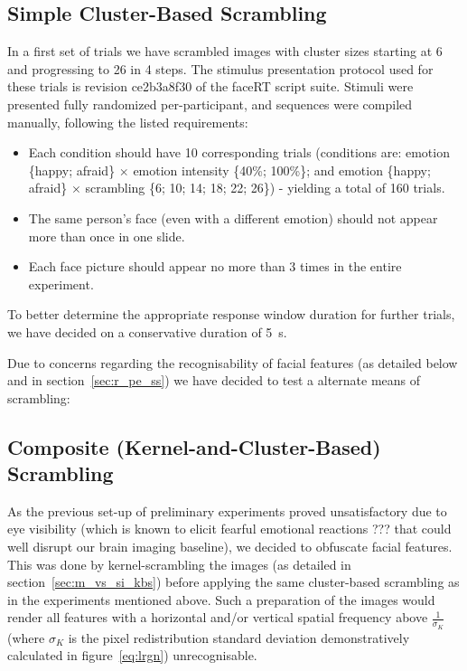 	\subsection{Simple Cluster-Based Scrambling}\label{sec:m_pe_ss}
	    In a first set of trials we have scrambled images with cluster sizes starting at \SI{6}{\pixel} and progressing to \SI{26}{\pixel} in \SI{4}{\pixel} steps.
	    The stimulus presentation protocol used for these trials is revision \textcolor{lg}{ce2b3a8f30} of the faceRT\cite{faceRT} script suite.
	    Stimuli were presented fully randomized per-participant, and sequences were compiled manually, following the listed requirements:
	    \begin{itemize}
		\item Each condition should have 10 corresponding trials (conditions are: emotion \{happy; afraid\} $\times$ emotion intensity \{40\%; 100\%\}; and emotion \{happy; afraid\} $\times$ scrambling \{6; 10; 14; 18; 22; 26\}) - yielding a total of 160 trials.
		\item The same person's face (even with a different emotion) should not appear more than once in one slide.
		\item Each face picture should appear no more than 3 times in the entire experiment.
	    \end{itemize}
	    To better determine the appropriate response window duration for further trials, we have decided on a conservative duration of \SI{5}{\second}.
	    
	    Due to concerns regarding the recognisability of facial features (as detailed below and in section~\ref{sec:r_pe_ss}) we have decided to test a alternate means of scrambling:
	\subsection{Composite (Kernel-and-Cluster-Based) Scrambling}\label{sec:m_pe_cs}
	    As the previous set-up of preliminary experiments proved unsatisfactory due to eye visibility (which is known to elicit fearful emotional reactions ??? that could well disrupt our brain imaging baseline), we decided to obfuscate facial features.
	    This was done by kernel-scrambling the images (as detailed in section~\ref{sec:m_vs_si_kbs}) before applying the same cluster-based scrambling as in the experiments mentioned above.
	    Such a preparation of the images would render all features with a horizontal and/or vertical spatial frequency above $\frac{1}{\sigma_{K}}$ (where $\sigma_{K}$ is the pixel redistribution standard deviation demonstratively calculated in figure~\ref{eq:lrgn}) unrecognisable.
	    
